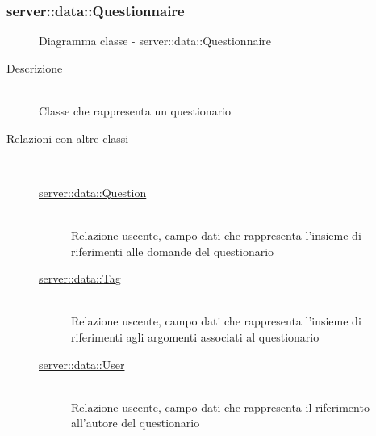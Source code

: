 \subsubsection[Questionnaire]{server::data::Questionnaire}
\begin{figure}[H]
	\centering
	\caption{Diagramma classe - server::data::Questionnaire}
\end{figure}\begin{description}
\item[Descrizione] \hfill \\
Classe che rappresenta un questionario
\item[Relazioni con altre classi] \hfill \\
\vspace{-7mm}
\begin{description}
	\item[\hyperlink{server::data::Question}{server::data::Question}] \hfill \\
	Relazione uscente, campo dati che rappresenta l'insieme di riferimenti alle domande del questionario
	\item[\hyperlink{server::data::Tag}{server::data::Tag}] \hfill \\
	Relazione uscente, campo dati che rappresenta l'insieme di riferimenti agli argomenti associati al questionario
	\item[\hyperlink{server::data::User}{server::data::User}] \hfill \\
	Relazione uscente, campo dati che rappresenta il riferimento all'autore del questionario
\end{description}


\end{description}
